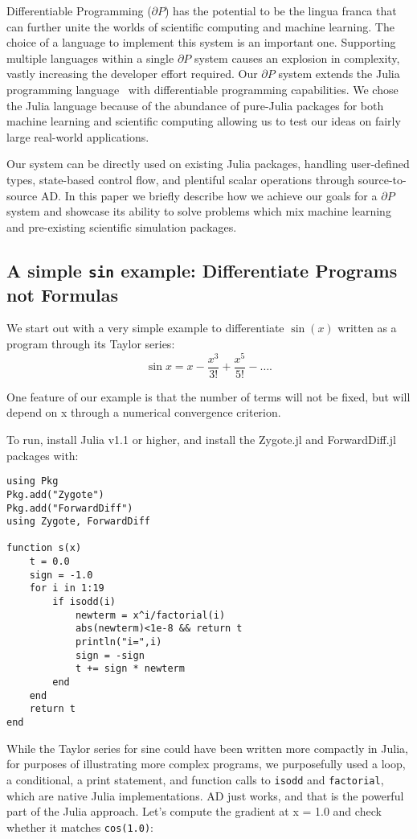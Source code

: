 \documentclass{juliacon}
\begin{document}
    Differentiable Programming ($\partial P$) has the potential to be the lingua franca that can further unite the worlds of scientific computing and machine learning. The choice of a language to implement this system is an important one. Supporting multiple languages within a single $\partial P$ system causes an explosion in complexity, vastly increasing the developer effort required. Our $\partial P$ system extends the Julia programming language~\cite{Julia-2017-a} with differentiable programming capabilities. We chose the Julia language because of the abundance of pure-Julia packages for both machine learning and scientific computing allowing us to test our ideas on fairly large real-world applications.
    
    Our system can be directly used on existing Julia packages, handling  user-defined types, state-based control flow, and plentiful scalar operations through source-to-source AD. In this paper we briefly describe how we achieve our goals for a $\partial P$ system and showcase its ability to solve problems which mix machine learning and pre-existing scientific simulation packages. 
    
\subsection{A simple {\tt sin} example: Differentiate Programs not Formulas}

We start out with a very simple example to differentiate $\sin(x)$ written as a program through its Taylor series:
$$\sin x =
x - \frac{x^3}{3!}
+\frac{x^5}{5!}-\ldots .$$


One feature of our example is that the number of terms will not be fixed, but will depend on x through a numerical convergence criterion.

To run, install Julia v1.1 or higher, and install the Zygote.jl and ForwardDiff.jl packages with:

\begin{verbatim}
using Pkg
Pkg.add("Zygote")
Pkg.add("ForwardDiff")
using Zygote, ForwardDiff

function s(x) 
    t = 0.0
    sign = -1.0 
    for i in 1:19   
        if isodd(i)
            newterm = x^i/factorial(i)
            abs(newterm)<1e-8 && return t
            println("i=",i)
            sign = -sign
            t += sign * newterm
        end
    end
    return t 
end
\end{verbatim}

While the Taylor series for sine could have been written more compactly in Julia, for purposes of illustrating more complex programs, we purposefully used a loop, a conditional, a print statement, and function calls to \verb+isodd+ and \verb+factorial+, which are native Julia implementations. AD just works, and that is the powerful part of the Julia approach. Let’s compute the gradient at x = 1.0 and check whether it matches \verb+cos(1.0)+:
\end{document}
